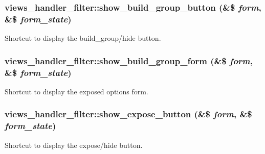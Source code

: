 {\subsubsection[{show\_\-build\_\-group\_\-button}]{\setlength{\rightskip}{0pt plus 5cm}views\_\-handler\_\-filter::show\_\-build\_\-group\_\-button (\&\$ {\em form}, \/  \&\$ {\em form\_\-state})}}
\label{classviews__handler__filter_a453c04cda91e955d5ea522044353c331}
Shortcut to display the build\_\-group/hide button. \hypertarget{classviews__handler__filter_a84a939dda3daf1c9c8f97058684271d2}{
\subsubsection[{show\_\-build\_\-group\_\-form}]{\setlength{\rightskip}{0pt plus 5cm}views\_\-handler\_\-filter::show\_\-build\_\-group\_\-form (\&\$ {\em form}, \/  \&\$ {\em form\_\-state})}}
\label{classviews__handler__filter_a84a939dda3daf1c9c8f97058684271d2}
Shortcut to display the exposed options form. \hypertarget{classviews__handler__filter_afa388297472d32d4bcb976bf3515d16a}{
\subsubsection[{show\_\-expose\_\-button}]{\setlength{\rightskip}{0pt plus 5cm}views\_\-handler\_\-filter::show\_\-expose\_\-button (\&\$ {\em form}, \/  \&\$ {\em form\_\-state})}}
\label{classviews__handler__filter_afa388297472d32d4bcb976bf3515d16a}
Shortcut to display the expose/hide button. 

